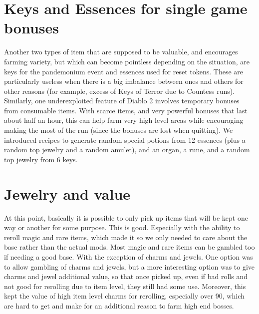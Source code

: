 \documentclass[12pt,a4paper]{article}
\begin{document}
\section{Keys and Essences for single game bonuses}

Another two types of item that are supposed to be valuable, and encourages farming variety, but which can become pointless depending on the situation, are keys for the pandemonium event and essences used for reset tokens. These are particularly useless when there is a big imbalance between ones and others for other reasons (for example, excess of Keys of Terror due to Countess runs).\\

Similarly, one underexploited feature of Diablo 2 involves temporary bonuses from consumable items. With scarce items, and very powerful bonuses that last about half an hour, this can help farm very high level areas while encouraging making the most of the run (since the bonuses are lost when quitting). We introduced recipes to generate random special potions from 12 essences (plus a random top jewelry and a random amulet), and an organ, a rune, and a random top jewelry from 6 keys.\\

\begin{center}
\end{center}

\section{Jewelry and value}

At this point, basically it is possible to only pick up items that will be kept one way or another for some purpose. This is good. Especially with the ability to reroll magic and rare items, which made it so we only needed to care about the base rather than the actual mods. Most magic and rare items can be gambled too if needing a good base. With the exception of charms and jewels. One option was to allow gambling of charms and jewels, but a more interesting option was to give charms and jewel additional value, so that once picked up, even if bad rolls and not good for rerolling due to item level, they still had some use. Moreover, this kept the value of high item level charms for rerolling, especially over 90, which are hard to get and make for an additional reason to farm high end bosses.\\
\end{document}

